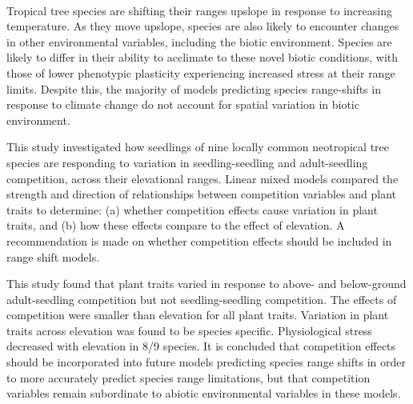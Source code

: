 \documentclass[a4paper,10pt,]{report}
\begin{document}
\\
\vspace{0.2cm}
Tropical tree species are shifting their ranges upslope in response to increasing temperature. As they move upslope, species are also likely to encounter changes in other environmental variables, including the biotic environment. Species are likely to differ in their ability to acclimate to these novel biotic conditions, with those of lower phenotypic plasticity experiencing increased stress at their range limits. Despite this, the majority of models predicting species range-shifts in response to climate change do not account for spatial variation in biotic environment.

This study investigated how seedlings of nine locally common neotropical tree species are responding to variation in seedling-seedling and adult-seedling competition, across their elevational ranges. Linear mixed models compared the strength and direction of relationships between competition variables and plant traits to determine: (a) whether competition effects cause variation in plant traits, and (b) how these effects compare to the effect of elevation. A recommendation is made on whether competition effects should be included in range shift models.

This study found that plant traits varied in response to above- and below-ground adult-seedling competition but not seedling-seedling competition. The effects of competition were smaller than elevation for all plant traits. Variation in plant traits across elevation was found to be species specific. Physiological stress decreased with elevation in 8/9 species. It is concluded that competition effects should be incorporated into future models predicting species range shifts in order to more accurately predict species range limitations, but that competition variables remain subordinate to abiotic environmental variables in these models.


\clearpage
\end{document}
